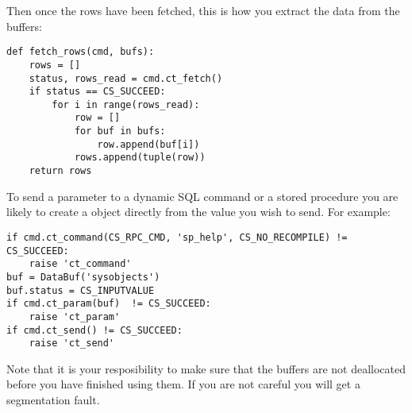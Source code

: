 Then once the rows have been fetched, this is how you extract the data
from the buffers:

\begin{verbatim}
def fetch_rows(cmd, bufs):
    rows = []
    status, rows_read = cmd.ct_fetch()
    if status == CS_SUCCEED:
        for i in range(rows_read):
            row = []
            for buf in bufs:
                row.append(buf[i])
            rows.append(tuple(row))
    return rows
\end{verbatim}

To send a parameter to a dynamic SQL command or a stored procedure you
are likely to create a  object directly from the value
you wish to send.  For example:

\begin{verbatim}
if cmd.ct_command(CS_RPC_CMD, 'sp_help', CS_NO_RECOMPILE) != CS_SUCCEED:
    raise 'ct_command'
buf = DataBuf('sysobjects')
buf.status = CS_INPUTVALUE
if cmd.ct_param(buf)  != CS_SUCCEED:
    raise 'ct_param'
if cmd.ct_send() != CS_SUCCEED:
    raise 'ct_send'
\end{verbatim}

Note that it is your resposibility to make sure that the buffers are
not deallocated before you have finished using them.  If you are not
careful you will get a segmentation fault.
